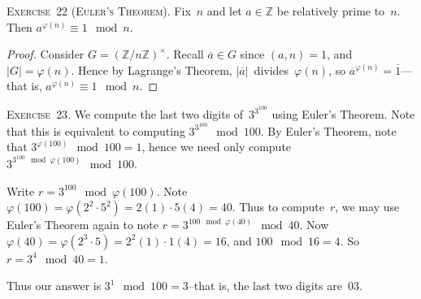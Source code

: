 \documentclass[letterpaper]{article}
\newcommand{\exercise}[1]{\goodbreak\noindent\textsc{Exercise~{#1}.}}
\newcommand{\Z}{\mathbb{Z}}
\newcommand{\res}[1]{\overline{#1}}
\newcommand{\ord}[1]{|{#1}|}
\begin{document}
\exercise{22 (Euler's Theorem)}
Fix~$n$ and let $a\in\Z$ be relatively prime to~$n$. Then $a^{\varphi(n)}\equiv 1\mod n$.
\begin{proof}
Consider $G=(\Z/n\Z)^{\times}$. Recall $\res{a}\in G$ since $(a,n)=1$, and $\ord{G}=\varphi(n)$. Hence by Lagrange's Theorem, $\ord{\res{a}}$~divides~$\varphi(n)$, so $\res{a}^{\varphi(n)}=\res{1}$---that is, $a^{\varphi(n)}\equiv 1\mod n$.
\end{proof}

\exercise{23}
We compute the last two digits of~$3^{3^{100}}$ using Euler's Theorem. Note that this is equivalent to computing $3^{3^{100}}\mod 100$. By Euler's Theorem, note that $3^{\varphi(100)}\mod 100=1$, hence we need only compute $3^{3^{100}\mod\varphi(100)}\mod 100$.

Write $r=3^{100}\mod\varphi(100)$. Note $\varphi(100)=\varphi(2^2\cdot 5^2)=2(1)\cdot 5(4)=40$. Thus to compute~$r$, we may use Euler's Theorem again to note $r=3^{100\mod\varphi(40)}\mod 40$. Now $\varphi(40)=\varphi(2^3\cdot 5)=2^2(1)\cdot 1(4)=16$, and $100\mod 16=4$. So $r=3^4\mod 40=1$.

Thus our answer is $3^1\mod 100=3$--that is, the last two digits are~$03$.
\end{document}
